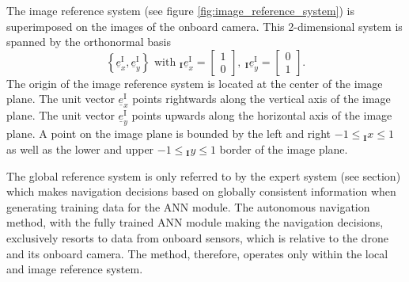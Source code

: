 The image reference system (see figure \ref{fig:image_reference_system}) 
is superimposed on the images of the onboard camera.
This 2-dimensional system is spanned by the orthonormal basis
\begin{equation}
    \left\{
        \underline e^\text{I}_x,
        \underline e^\text{I}_y
    \right\}
    \text{ with }
    {}_\textbf{I}\underline e^\text{I}_x 
    = 
    \begin{bmatrix}
        1 \\ 0
    \end{bmatrix}
    ,\ 
    {}_\textbf{I}\underline e^\text{I}_y 
    = 
    \begin{bmatrix}
        0 \\ 1
    \end{bmatrix}
    .
\end{equation}
The origin of the image reference system 
is located at the center of the image plane.
The unit vector 
$
    \underline e^\text{I}_x
$ 
points rightwards along the vertical axis of the image plane.
The unit vector 
$
    \underline e^\text{I}_y
$ 
points upwards along the horizontal axis of the image plane.
A point
on the image plane 
is bounded by the left and right
$
    -1 \le {}_\textbf{I}x \le 1
$
as well as the lower and upper
$
-1 \le {}_\textbf{I}y \le 1
$
border of the image plane.



The global reference system 
is only referred to 
by the expert system (see section)
which makes navigation decisions based on globally consistent information
when generating training data for the ANN module.
The autonomous navigation method, 
with the fully trained ANN module making the navigation decisions,
exclusively resorts to data from onboard sensors,
which is relative to the drone and its onboard camera.
The method, therefore, operates only within the local and image reference system.




